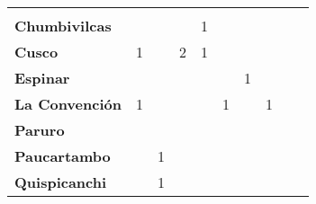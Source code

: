 \begin{tabular}{lccccccccc}
	&\cellcolor[HTML]{FCC46C}					&\cellcolor[HTML]{FCC46C}					&\cellcolor[HTML]{FCC46C}					&\cellcolor[HTML]{FCC46C}					&\cellcolor[HTML]{FCC46C}					&\cellcolor[HTML]{FCC46C}					&\cellcolor[HTML]{FCC46C}					&\cellcolor[HTML]{FCC46C}
	&\cellcolor[HTML]{FCC46C}					\\
	\textbf{Chumbivilcas}                      												
	&\cellcolor[HTML]{FCC46C}
	&\cellcolor[HTML]{FCC46C}					&\cellcolor[HTML]{FCC46C}
	&1											&\cellcolor[HTML]{FCC46C}
	&\cellcolor[HTML]{FCC46C}					&\cellcolor[HTML]{FCC46C}
	&\cellcolor[HTML]{FCC46C}					&\cellcolor[HTML]{FCC46C}\\
	\textbf{Cusco}                            							
	&1
	&\cellcolor[HTML]{FCC46C}					&2
	&1											&\cellcolor[HTML]{FCC46C}
	&\cellcolor[HTML]{FCC46C}					&\cellcolor[HTML]{FCC46C}
	&\cellcolor[HTML]{FCC46C}					&\cellcolor[HTML]{FCC46C}\\
	\textbf{Espinar}       					             									&\cellcolor[HTML]{FCC46C}					&\cellcolor[HTML]{FCC46C}					&\cellcolor[HTML]{FCC46C}					&\cellcolor[HTML]{FCC46C}					&\cellcolor[HTML]{FCC46C}					&1											&\cellcolor[HTML]{FCC46C}
	&\cellcolor[HTML]{FCC46C}					&\cellcolor[HTML]{FCC46C}\\
	\textbf{La Convención}                      					
	&1											&\cellcolor[HTML]{FCC46C}					&\cellcolor[HTML]{FCC46C}					&\cellcolor[HTML]{FCC46C}					&1											&\cellcolor[HTML]{FCC46C}
	&1											&\cellcolor[HTML]{FCC46C}
	&\cellcolor[HTML]{FCC46C}\\
	\textbf{Paruro}                            					
	&\cellcolor[HTML]{FCC46C}					&\cellcolor[HTML]{FCC46C}					&\cellcolor[HTML]{FCC46C}					&\cellcolor[HTML]{FCC46C}					&\cellcolor[HTML]{FCC46C}					&\cellcolor[HTML]{FCC46C}
	&\cellcolor[HTML]{FCC46C} 					&\cellcolor[HTML]{FCC46C}
	&\cellcolor[HTML]{FCC46C}\\
	\textbf{Paucartambo}               		                       			
	&\cellcolor[HTML]{FCC46C}					&1											&\cellcolor[HTML]{FCC46C}					&\cellcolor[HTML]{FCC46C}					&\cellcolor[HTML]{FCC46C}					&\cellcolor[HTML]{FCC46C}
	&\cellcolor[HTML]{FCC46C}					&\cellcolor[HTML]{FCC46C}
	&\cellcolor[HTML]{FCC46C}\\
	\textbf{Quispicanchi}                                         	      					
	&\cellcolor[HTML]{FCC46C}
	&1											&\cellcolor[HTML]{FCC46C}
	&\cellcolor[HTML]{FCC46C} 					&\cellcolor[HTML]{FCC46C}
	&\cellcolor[HTML]{FCC46C}					&\cellcolor[HTML]{FCC46C}
	&\cellcolor[HTML]{FCC46C}					&\cellcolor[HTML]{FCC46C}\\

\end{tabular}
